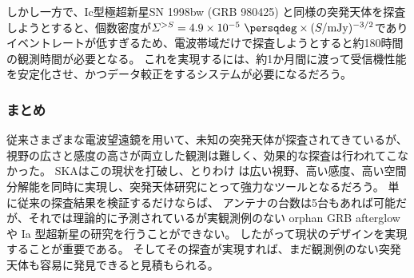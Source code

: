 {しかし一方で、Ic型極超新星SN 1998bw (GRB 980425) と同様の突発天体を探査しようとすると、個数密度が$\varSigma^{>S} = 4.9\times 10^{-5}~\persqdeg \times (S/\text{mJy})^{-3/2}$でありイベントレートが低すぎるため、電波帯域だけで探査しようとすると約180時間の観測時間が必要となる。
これを実現するには、約1か月間に渡って受信機性能を安定化させ、かつデータ較正をするシステムが必要になるだろう。

\subsubsection{まとめ}

従来さまざまな電波望遠鏡を用いて、未知の突発天体が探査されてきているが、視野の広さと感度の高さが両立した観測は難しく、効果的な探査は行われてこなかった。
SKAはこの現状を打破し、とりわけ\skasur{} は広い視野、高い感度、高い空間分解能を同時に実現し、突発天体研究にとって強力なツールとなるだろう。
単に従来の探査結果を検証するだけならば、 アンテナの台数は5台もあれば可能だが、それでは理論的に予測されているが実観測例のない orphan GRB afterglow や Ia 型超新星の研究を行うことができない。
したがって現状のデザインを実現することが重要である。
そしてその探査が実現すれば、まだ観測例のない突発天体も容易に発見できると見積もられる。




} %
